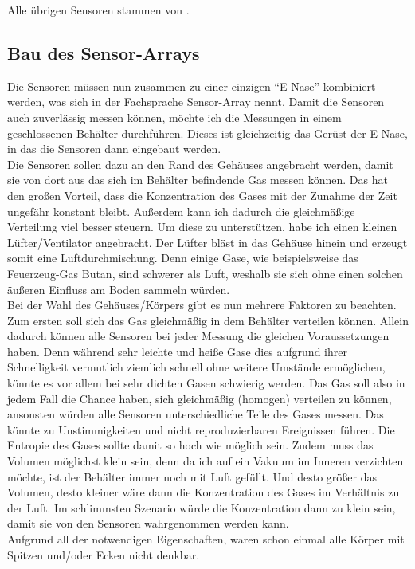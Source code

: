 \documentclass[10pt]{article}
\begin{document}
\bigskip
Alle übrigen Sensoren stammen von \autocite{MQSensoren}.

\subsection{Bau des Sensor-Arrays}
Die Sensoren müssen nun zusammen zu einer einzigen "`E-Nase"' kombiniert werden, was sich in der Fachsprache Sensor-Array nennt.
Damit die Sensoren auch zuverlässig messen können, möchte ich die Messungen in einem geschlossenen Behälter durchführen. Dieses ist gleichzeitig
das Gerüst der E-Nase, in das die Sensoren dann eingebaut werden.\\
Die Sensoren sollen dazu an den Rand des Gehäuses angebracht werden, damit sie von dort aus das sich im Behälter befindende Gas
messen können. Das hat den großen Vorteil, dass die Konzentration des Gases mit der Zunahme der Zeit ungefähr konstant bleibt.
Außerdem kann ich dadurch die gleichmäßige Verteilung viel besser steuern. Um diese zu unterstützen, habe ich einen kleinen Lüfter/Ventilator angebracht. 
Der Lüfter bläst in das Gehäuse hinein und erzeugt somit eine Luftdurchmischung. Denn einige Gase, wie beispielsweise das Feuerzeug-Gas
Butan, sind schwerer als Luft, weshalb sie sich ohne einen solchen äußeren Einfluss am Boden sammeln würden.\\
Bei der Wahl des Gehäuses/Körpers gibt es nun mehrere Faktoren zu beachten. Zum ersten soll sich das Gas gleichmäßig in dem Behälter verteilen können.
Allein dadurch können alle Sensoren bei jeder Messung die gleichen Voraussetzungen haben. Denn während sehr leichte und heiße Gase dies aufgrund ihrer Schnelligkeit vermutlich ziemlich schnell
ohne weitere Umstände ermöglichen, könnte es vor allem bei sehr dichten Gasen schwierig werden. Das Gas soll also in jedem Fall die Chance haben, sich gleichmäßig (homogen)
verteilen zu können, ansonsten würden alle Sensoren unterschiedliche Teile des Gases messen. Das könnte zu Unstimmigkeiten und nicht reproduzierbaren Ereignissen führen. 
Die Entropie des Gases sollte damit so hoch wie möglich sein. Zudem muss das Volumen möglichst klein sein,
denn da ich auf ein Vakuum im Inneren verzichten möchte, ist der Behälter immer noch mit Luft gefüllt.
Und desto größer das Volumen, desto kleiner wäre dann die Konzentration des Gases im Verhältnis zu der Luft. Im schlimmsten Szenario
würde die Konzentration dann zu klein sein, damit sie von den Sensoren wahrgenommen werden kann.\\
Aufgrund all der notwendigen Eigenschaften, waren schon einmal alle Körper mit Spitzen und/oder Ecken nicht denkbar. 
\end{document}
